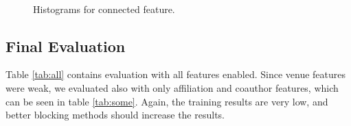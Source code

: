 \documentclass[twocolumn,letterpaper]{article}
\begin{document}
\begin{figure}[ht!]%
\centering 
{}\qquad 
{}\\ 
\caption{Histograms for connected feature.} 
\label{fig:3figs}
\end{figure}

\subsection{Final Evaluation} %
\label{sub:final_evaluation}
Table \ref{tab:all} contains evaluation with all features enabled. Since venue features were weak, we evaluated also with only affiliation and coauthor features, which can be seen in table \ref{tab:some}. Again, the training results are very low, and better blocking methods should increase the results. 
\end{document}
